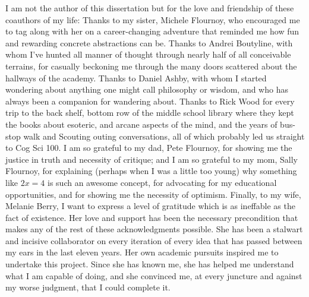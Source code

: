I am not the author of this dissertation but for the love and friendship of these coauthors of my life:
Thanks to my sister, Michele Flournoy, who encouraged me to tag along with her on a career-changing adventure that reminded me how fun and rewarding concrete abstractions can be.
Thanks to Andrei Boutyline, with whom I've hunted all manner of thought through nearly half of all conceivable terrains, for casually beckoning me through the many doors scattered about the hallways of the academy.
Thanks to Daniel Ashby, with whom I started wondering about anything one might call philosophy or wisdom, and who has always been a companion for wandering about.
Thanks to Rick Wood for every trip to the back shelf, bottom row of the middle school library where they kept the books about esoteric, and arcane aspects of the mind, and the years of bus-stop walk and Scouting outing conversations, all of which probably led us straight to Cog Sci 100.
I am so grateful to my dad, Pete Flournoy, for showing me the justice in truth and necessity of critique; and I am so grateful to my mom, Sally Flournoy, for explaining (perhaps when I was a little too young) why something like $2x=4$ is such an awesome concept, for advocating for my educational opportunities, and for showing me the necessity of optimism.
Finally, to my wife, Melanie Berry, I want to express a level of gratitude which is as ineffable as the fact of existence.
Her love and support has been the necessary precondition that makes any of the rest of these acknowledgments possible.
She has been a stalwart and incisive collaborator on every iteration of every idea that has passed between my ears in the last eleven years. 
Her own academic pursuits inspired me to undertake this project.
Since she has known me, she has helped me understand what I am capable of doing, and she convinced me, at every juncture and against my worse judgment, that I could complete it.
